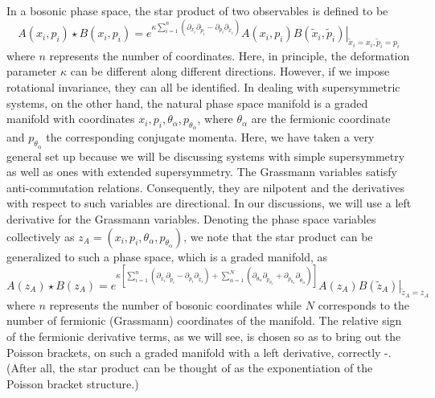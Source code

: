 \documentclass[a4paper,11pt]{article}
\begin{document}
In a bosonic phase space, the star product of two observables is
defined to be
\begin{equation}
A(x_{i},p_{i})\star B(x_{i},p_{i}) = e^{\kappa\sum_{i=1}^{n}
(\partial_{x_{i}}\partial_{\tilde{p}_{i}}-\partial_{p_{i}}
\partial_{\tilde{x}_{i}})} 
\left.A(x_{i},p_{i})B(\tilde{x}_{i},\tilde{p}_{i})\right|_{\tilde{x}_{i}=x_{i},
\tilde{p}_{i}=p_{i}}
\end{equation}
where $n$ represents the number of coordinates. Here, in principle,
the  deformation parameter $\kappa$ can be
different along different directions. However, if we impose rotational
invariance, they can all be identified. In dealing with
supersymmetric systems, on the other hand, the
natural phase space manifold is a graded manifold with coordinates
$x_{i},p_{i},\theta_{\alpha},p_{\theta_{\alpha}}$, where
$\theta_{\alpha}$ are the fermionic coordinate
and $p_{\theta_{\alpha}}$ the corresponding conjugate momenta. Here,
we have taken a very general set up because we will be discussing
systems with simple supersymmetry as well as ones with extended
supersymmetry.  The Grassmann
variables satisfy anti-commutation relations. Consequently, they are
nilpotent and the derivatives with respect to such variables are
directional. In our discussions, we will use a left derivative for the
Grassmann variables. Denoting the phase space variables collectively
as $z_{A} = (x_{i},p_{i},\theta_{\alpha},p_{\theta_{\alpha}})$, we
note that the star product can be
generalized to such a phase space, which is a graded manifold, as
\cite{15} 
\begin{equation}
A(z_{A})\star B(z_{A}) =
e^{\kappa\left[\sum_{i=1}^{n}(\partial_{x_{i}}\partial_{\tilde{p}_{i}}-
\partial_{p_{i}}\partial_{\tilde{x}_{i}}) 
+ \sum_{\alpha =1}^{N}
(\partial_{\theta_{\alpha}}\partial_{\tilde{p}_{\theta_{\alpha}}}+
\partial_{p_{\theta_{\alpha}}}
\partial_{\tilde{\theta}_{\alpha}})\right]}
\left. A(z_{A})B(\tilde{z}_{A})\right|_{\tilde{z}_{A}=z_{A}}\label{1}
\end{equation}
where $n$ represents the number of bosonic coordinates while $N$
corresponds to the number of fermionic (Grassmann) coordinates of the
manifold. 
The relative sign of the fermionic derivative terms, as we will see,
is chosen so as to bring out the Poisson brackets, on such a graded
manifold with a left derivative, correctly \cite{18}-\cite{19}. (After
all,  the star
product can be thought of as the exponentiation of the Poisson bracket
structure.)
\end{document}
